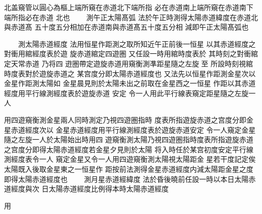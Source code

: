 \begin{正文}
北盖窺管以圓心為樞上端所窺在赤道北下端所指
必在赤道南上端所窺在赤道南下端所指必在赤道
北也
　　測午正太陽髙弧
法於午正時測得太陽赤道緯度在赤道北與赤道髙
五十度五分相加在赤道南與赤道髙五十度五分相
減即午正太陽髙弧也
\par
　　測太陽赤道經度
法用恒星作距測之取所知近午正前後一恒星
以其赤道經度之對衝用綰經度表於遊
旋赤道綰定四遊圏
又任設一時用綰時度表於
其時刻之對衝綰定天常赤道
乃将四
逰圏帶定遊旋赤道用窺衡測凖距星隨之左旋𠉀至
所設時刻視綰時度表對於遊旋赤道之
某宫度分即太陽赤道經度也
又法先以恒星作距測金星次以金星作距測太陽如
金星晨見則於太陽未出之前取在金星西之一恒星
作距以其赤道經度用平行線測經度表於遊旋赤道
安定
令一人用此平行線表窺定距星隨之左旋一人
\par
用四遊窺衡測金星兩人同時測定乃視四遊圏指時
度表所指遊旋赤道之宫度分即金星赤道經度次以
金星赤道經度用平行線測經度表於遊旋赤道安定
令一人窺定金星隨之左旋一人於太陽始出時用四
遊窺衡測太陽乃視四遊圏指時度表所指遊旋赤道
之宫度分即得太陽赤道經度若金星夕見則於太陽
将入時任於某宫初度安定平行線測經度表令一人
窺定金星又令一人用四遊窺衡測太陽視太陽距金
星若干度記定俟太陽既入後取金星東之一恒星作
距按前法測得金星赤道經度内減太陽距金星之度
即得太陽赤道經度也
　　測月星赤道經緯度
法於昏後曉前任設一時以本日太陽赤道經度與次
日太陽赤道經度比例得本時太陽赤道經度
\par
用

\end{正文}
